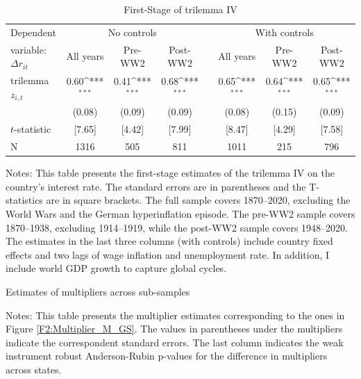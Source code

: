 \documentclass[12pt]{article}
\newcommand{\annote}[1]{\parbox{\textwidth}{\renewcommand{\baselinestretch}{1.0}\vspace{12pt} \footnotesize Notes: #1}}
\begin{document}
\begin{appendices}
\begin{table}[ht]
\centering
\caption{First-Stage of trilemma IV} \label{T:First_Stage}
\vspace{1ex}
\def\sym#1{\ifmmode^{#1}\else\(^{#1}\)\fi}
\begin{tabular}{lccccccc}
\toprule
Dependent & \multicolumn{3}{c}{No controls} && \multicolumn{3}{c}{With controls} \\  \cline{2-4} \cline{6-8}
variable: $\Delta r_{it}$                    &\multicolumn{1}{c}{All years}&\multicolumn{1}{c}{Pre-WW2}&\multicolumn{1}{c}{Post-WW2}& &\multicolumn{1}{c}{All years}&\multicolumn{1}{c}{Pre-WW2}&\multicolumn{1}{c}{Post-WW2}\\
\midrule
trilemma $z_{i,t}$     &       0.60\sym{***}&        0.41\sym{***}&        0.68\sym{***}& &       0.65\sym{***}&        0.64\sym{***}&        0.65\sym{***}\\
                    &      (0.08)         &      (0.09)         &      (0.09)         &  &    (0.08)         &      (0.15)         &      (0.09)         \\
$ t $-statistic     &      [7.65]         &      [4.42]         &      [7.99]         &    &  [8.47]         &      [4.29]         &      [7.58]         \\
N                   &        1316         &         505         &         811         &  &      1011         &         215         &         796         \\
\bottomrule
\end{tabular} 
\annote{This table presents the first-stage estimates of the trilemma IV on the country's interest rate. The standard errors are in parentheses and the T-statistics are in square brackets. The full sample covers 1870–2020, excluding the World Wars and the German hyperinflation episode. The pre-WW2 sample covers 1870–1938, excluding 1914–1919, while the post-WW2 sample covers 1948–2020. The estimates in the last three columns (with controls) include country fixed effects and two lags of wage inflation and unemployment rate. In addition, I include world GDP growth to capture global cycles.}
\end{table}

\begin{table}[ht]
\centering
\def\sym#1{\ifmmode^{#1}\else\(^{#1}\)\fi}
\caption{Estimates of multipliers across sub-samples \label{T:SDPM_GS}}

\annote{\footnotesize This table presents the multiplier estimates corresponding to the ones in Figure \ref{F2:Multiplier_M_GS}. The values in parentheses under the multipliers indicate the correspondent standard errors. The last column indicates the weak instrument robust Anderson-Rubin p-values for the difference in multipliers across states.}
\end{table}


\end{appendices}
\end{document}
